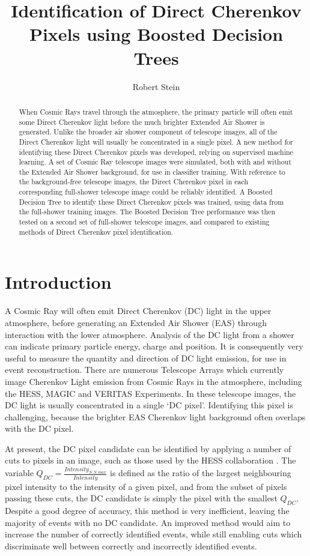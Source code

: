 \documentclass[]{article}
\title{Identification of Direct Cherenkov Pixels using Boosted Decision Trees}
\author{Robert Stein}
\begin{document}
\maketitle

\begin{abstract}
When Cosmic Rays travel through the atmosphere, the primary particle will often emit some Direct Cherenkov light before the much brighter Extended Air Shower is generated. Unlike the broader air shower component of telescope images, all of the Direct Cherenkov light will usually be concentrated in a single pixel. A new method for identifying these Direct Cherenkov pixels was developed, relying on supervised machine learning. A set of Cosmic Ray telescope images were simulated, both with and without the Extended Air Shower background, for use in classifier training. With reference to the background-free telescope images, the Direct Cherenkov pixel in each corresponding full-shower telescope image could be reliably identified. A Boosted Decision Tree to identify these Direct Cherenkov pixels was trained, using data from the full-shower training images. The Boosted Decision Tree performance was then tested on a second set of full-shower telescope images, and compared to existing methods of Direct Cherenkov pixel identification.
\end{abstract}

\section{Introduction}
A Cosmic Ray will often emit Direct Cherenkov (DC) light in the upper atmosphere, before generating an Extended Air Shower (EAS) through interaction with the lower atmosphere. Analysis of the DC light from a shower can indicate primary particle energy, charge and position. It is consequently very useful to measure the quantity and direction of DC light emission, for use in event reconstruction. There are numerous Telescope Arrays which currently image Cherenkov Light emission from Cosmic Rays in the atmosphere, including the HESS, MAGIC and VERITAS Experiments. In these telescope images, the DC light is usually concentrated in a single  \textquoteleft DC pixel'. Identifying this pixel is challenging, because the brighter EAS Cherenkov light background often overlaps with the DC pixel. 

At present, the DC pixel candidate can be identified by applying a number of cuts to pixels in an image, such as those used by the HESS collaboration \cite{hess07}. The variable $Q_{DC} = \frac{Intensity_{N.N.max}}{Intensity}$ is defined as the ratio of the largest neighbouring pixel intensity to the intensity of a given pixel, and from the subset of pixels passing these cuts, the DC candidate is simply the pixel with the smallest $Q_{DC}$. Despite a good degree of accuracy, this method is very inefficient, leaving the majority of events with no DC candidate. An improved method would aim to increase the number of correctly identified events, while still enabling cuts which discriminate well between correctly and incorrectly identified events.
\end{document}

